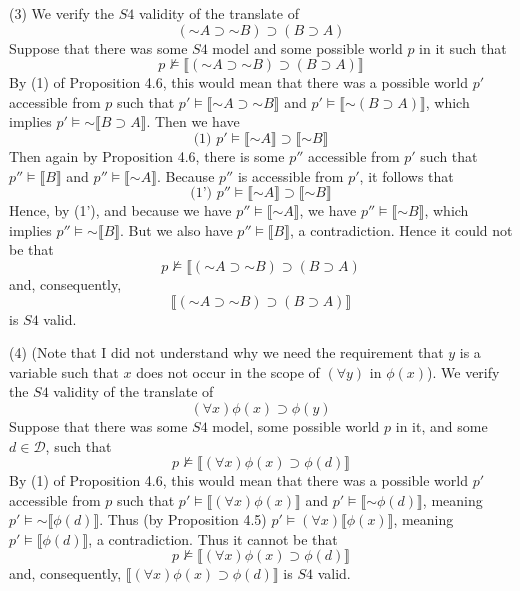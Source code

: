 \documentclass{article}
\newcommand*{\oldneg}{\mathord{\sim}}
\newcommand{\lbc}{\llbracket}
\newcommand{\rbc}{\rrbracket}
\theoremstyle{definition}
\begin{document}
(3) We verify the $S4$ validity of the translate of
\[ (\oldneg A\supset\oldneg B)\supset (B\supset A) \]
Suppose that there was some $S4$ model and some possible world $p$ in it such that 
\[ p\nvDash\lbc (\oldneg A\supset\oldneg B)\supset (B\supset A)\rbc \]
By (1) of Proposition 4.6, this would mean that there was a possible world $p'$ accessible from $p$ such that
$p'\vDash\lbc \oldneg A\supset\oldneg B\rbc$ and $p'\vDash\lbc\oldneg(B\supset A)\rbc$, which implies
$p'\vDash\oldneg\lbc B\supset A\rbc$. Then we have
\[\textrm{(1) }p'\vDash\lbc\oldneg A\rbc\supset\lbc\oldneg B\rbc \]
Then again by Proposition 4.6, there is some $p''$ accessible from
$p'$ such that $p''\vDash\lbc B\rbc$ and $p''\vDash\lbc\oldneg A\rbc$. Because $p''$ is accessible from 
$p'$, it follows that
\[\textrm{(1') }p''\vDash\lbc\oldneg A\rbc\supset\lbc\oldneg B\rbc \]
Hence, by (1'), and because we have $p''\vDash\lbc\oldneg A\rbc$, we have
$p''\vDash\lbc\oldneg B\rbc$, which implies $p''\vDash\oldneg\lbc B\rbc$. But we also have 
$p''\vDash\lbc B\rbc$, a contradiction. Hence it could not be that
\[ p\nvDash\lbc (\oldneg A\supset\oldneg B)\supset (B\supset A) \]
and, consequently,
\[ \lbc (\oldneg A\supset\oldneg B)\supset (B\supset A)\rbc \]
is $S4$ valid.

(4) (Note that I did not understand why we need the requirement that $y$ is a variable such that $x$ does not occur 
in the scope of $(\forall y)$ in $\phi(x)$). We verify the $S4$ validity of the translate of
\[ (\forall x)\phi(x)\supset\phi(y) \]
Suppose that there was some $S4$ model, some possible world $p$ in it, and some $d\in\mathcal{D}$, such that
\[ p\nvDash\lbc (\forall x)\phi(x)\supset\phi(d)\rbc \]
By (1) of Proposition 4.6, this would mean that there was a possible world $p'$ accessible from $p$ such that
$p'\vDash\lbc (\forall x)\phi(x)\rbc$ and $p'\vDash\lbc\oldneg \phi(d)\rbc$, meaning $p'\vDash\oldneg\lbc\phi(d)\rbc$. Thus (by Proposition 4.5) 
$p'\vDash(\forall x)\lbc \phi(x)\rbc$, meaning $p'\vDash\lbc\phi(d)\rbc$, a contradiction. Thus it cannot be that
\[ p\nvDash\lbc (\forall x)\phi(x)\supset\phi(d)\rbc \]
and, consequently,
$\lbc (\forall x)\phi(x)\supset\phi(d)\rbc$ is $S4$ valid.
\end{document}
